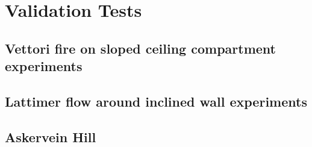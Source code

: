 \documentclass[12pt]{article}
\begin{document}
\section{Validation Tests}

\subsection{Vettori fire on sloped ceiling compartment experiments}





\subsection{Lattimer flow around inclined wall experiments}





\subsection{Askervein Hill}
\end{document}
